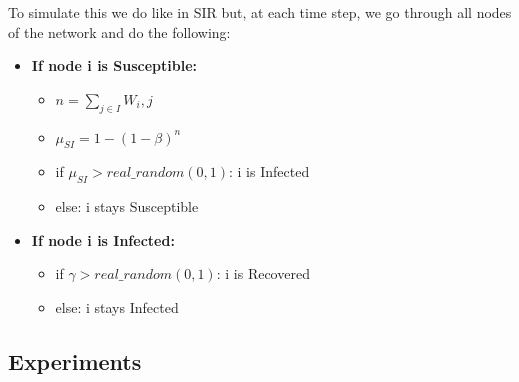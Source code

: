 To simulate this we do like in SIR but, at each time step, we go through all nodes of the network and do the following:
\begin{itemize}
    \item \textbf{If node i is Susceptible:} 
    \begin{itemize}
        \item[] $n=\sum_{j\in I}W_i,j$
        \item[] $\mu_{SI}=1-(1-\beta)^n$
        \item[] if $\mu_{SI}>real\_random(0,1)$: i is Infected
        \item[] else: i stays Susceptible  
    \end{itemize}
    \item \textbf{If node i is Infected:} 
    \begin{itemize}
        \item[] if $\gamma>real\_random(0,1)$: i is Recovered
        \item[] else: i stays Infected
    \end{itemize}
\end{itemize}
\subsection{Experiments}
\label{ssec:experiments}